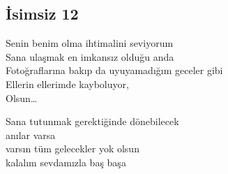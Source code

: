 \subsection{İsimsiz 12}

Senin benim olma ihtimalini seviyorum \\
Sana ulaşmak en imkansız olduğu anda \\
Fotoğraflarına bakıp da uyuyamadığım geceler gibi \\
Ellerin ellerimde kayboluyor, \\
Olsun…

\noindent\newline
Sana tutunmak gerektiğinde dönebilecek \\
anılar varsa \\
varsın tüm gelecekler yok olsun \\
kalalım sevdamızla baş başa